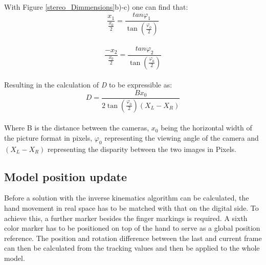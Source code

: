 With Figure \ref{stereo_Dimmensions}b)-c) one can find that:
\begin{equation}
\frac{x_{1}}{\frac{x_{0}}{2}}=\frac{tan \varphi_1}{\tan(\frac{\varphi_{0}}{2})}
\end{equation}\\
\begin{equation}
\frac{-x_{2}}{\frac{x_{0}}{2}}=\frac{tan \varphi_2}{\tan(\frac{\varphi_{0}}{2})}
\end{equation}\\
Resulting in the calculation of \textit{D} to be expressible as:
\begin{equation}
D=\frac{Bx_0}{2\tan(\frac{\varphi_0}{2})(X_{L}-X_{R})}
\end{equation}\\
Where B is the distance between the cameras, $x_0$ being the horizontal width of the picture format in pixels, $\varphi_0$ representing the viewing angle of the camera and $(X_{L}-X_{R})$ representing the disparity between the two images in Pixels.
\subsection{Model position update}
Before a solution with the inverse kinematics algorithm can be calculated, the hand movement in real space has to be matched with that on the digital side. To achieve this, a further marker besides the finger markings is required. A sixth color marker has to be positioned on top of the hand to serve as a global position reference. The position and rotation difference between the last and current frame can then be calculated from the tracking values and then be applied to the whole model.
